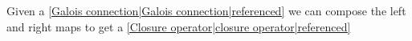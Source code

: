 Given a \ref{Galois connection|Galois connection|referenced} we can compose the left and right maps to get a \ref{Closure operator|closure operator|referenced}